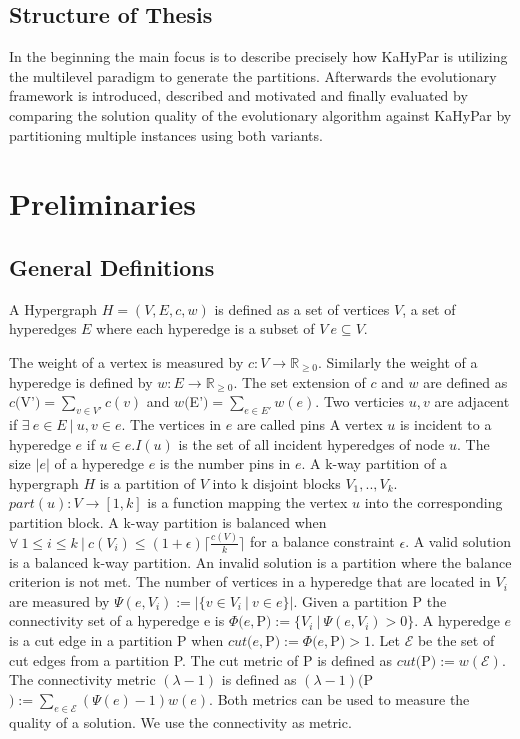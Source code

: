 \documentclass[a4paper,12pt,titlepage, BCOR7mm,headsepline]{scrbook}
\numberwithin{equation}{section}
\begin{document}
\section{Structure of Thesis}
In the beginning the main focus is to describe precisely how KaHyPar is utilizing the multilevel paradigm to generate the partitions. Afterwards the evolutionary framework is introduced, described and motivated and finally evaluated by comparing the solution quality of the evolutionary algorithm against KaHyPar by partitioning multiple instances using both variants. 
\chapter{Preliminaries}
\section{General Definitions}

A Hypergraph $H = (V, E, c, w)$ is defined as a set of vertices $V$, a set of hyperedges $E$ where each hyperedge is a subset of $V \ e \subseteq V$.

The weight of a vertex is measured by $c: V \rightarrow  \mathbb R_{\ge 0}$. Similarly the weight of a hyperedge is defined by $w: E \rightarrow  \mathbb R_{\ge 0}$. 
The set extension of $c$ and $w$ are defined as $c($V'$) = \sum_{v \in V'} c(v)$ and $w($E'$) = \sum_{e \in E'} w(e)$. 
Two verticies $u, v$ are adjacent if $\exists\ e \in E\ |\ u, v \in e$. The vertices in $e$ are called pins A vertex $u$ is incident to a hyperedge $e$ if $ u \in e$.$I(u)$ is the set of all incident hyperedges of node $u$. The size $|e|$ of a hyperedge $e$ is the number pins in $e$. A k-way partition of a hypergraph $H$ is a partition of $V$ into k disjoint blocks $V_1, .., V_k$. $part(u): V \rightarrow [1, k]$ is a function mapping the vertex $u$ into the corresponding partition block.
A k-way partition is balanced when $\forall\  1 \le i \le k\ |\ c(V_i) \le (1 + \epsilon) \lceil \frac{c(V)}{k} \rceil $ for a balance constraint $\epsilon$.
A valid solution is a balanced k-way partition. An invalid solution is a partition where the balance criterion is not met.
The number of vertices in a hyperedge that are located in $V_i$ are measured by $\Psi(e,V_i) := |\{v \in V_i \ |\ v \in e \}|$. Given a partition P the connectivity set of a hyperedge e is $\Phi(e, $P$) :=  \{V_i\ |\ \Psi(e, V_i) > 0\}$. 
A hyperedge $e$ is a cut edge in a partition P when $cut(e, $P$) := \Phi(e, $P$) > 1$. 
Let $\mathcal{E}$ be the set of cut edges from a partition P. The cut metric of P is defined as $cut($P$) := w(\mathcal{E})$.
The connectivity metric $(\lambda - 1)$ is defined as $(\lambda - 1)($P$) := \sum_{e \in \mathcal{E}}(\Psi(e) - 1)w(e)$.
Both metrics can be used to measure the quality of a solution. We use the connectivity as metric. 
\end{document}

